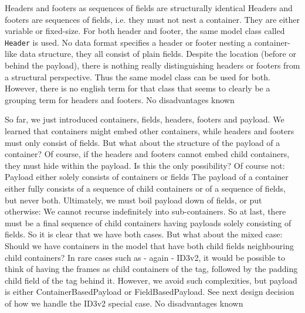 {%
Headers and footers as sequences of fields are structurally identical
}
{%
Headers and footers are sequences of fields, i.e. they must not nest a container. They are either variable or fixed-size. For both header and footer, the same model class called \texttt{Header} is used.
}
{%
No data format specifies a header or footer nesting a container-like data structure, they all consist of plain fields. Despite the location (before or behind the payload), there is nothing really distinguishing headers or footers from a structural perspective. Thus the same model class can be used for both. However, there is no english term for that class that seems to clearly be a grouping term for headers and footers.
}
{%
No disadvantages known
}

So far, we just introduced containers, fields, headers, footers and payload. We learned that containers might embed other containers, while headers and footers must only consist of fields. But what about the structure of the payload of a container? Of course, if the headers and footers cannot embed child containers, they must hide within the payload. Is this the only possibility? Of course not:
{%
Payload either solely consists of containers or fields
}
{%
The payload of a container either fully consists of a sequence of child containers or of a sequence of fields, but never both.
}
{%
Ultimately, we must boil payload down of fields, or put otherwise: We cannot recurse indefinitely into sub-containers. So at last, there must be a final sequence of child containers having payloads solely consisting of fields. So it is clear that we have both cases. But what about the mixed case: Should we have containers in the model that have both child fields neighbouring child containers? In rare cases such as - again - ID3v2, it would be possible to think of having the frames as child containers of the tag, followed by the padding child field of the tag behind it. However, we avoid such complexities, but payload is either ContainerBasedPayload or FieldBasedPayload. See next design decision of how we handle the ID3v2 special case.
}
{%
No disadvantages known
}

